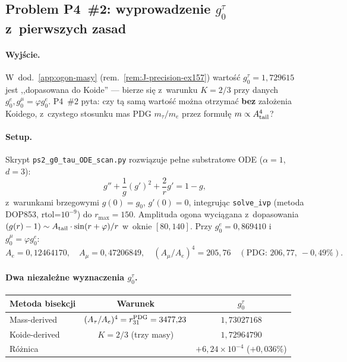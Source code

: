 \subsection{Problem P4~\#2: wyprowadzenie $g_0^\tau$
z~pierwszych zasad}%
\label{app:P4-g0tau}

\paragraph{Wyj\'scie.}
W~dod.~\ref{app:ogon-masy} (rem.~\ref{rem:J-precision-ex157})
warto\'s\'c $g_0^\tau = 1{,}729615$ jest ,,dopasowana do Koide'' ---
bierze si\k{e} z~warunku $K=2/3$ przy danych $g_0^e, g_0^\mu = \varphi g_0^e$.
P4~\#2 pyta: czy t\k{a} sam\k{a} warto\'s\'c mo\.zna otrzyma\'c \textbf{bez}
za\l{}o\.zenia Koidego, z~czystego stosunku mas PDG $m_\tau/m_e$
przez formu\l{}\k{e} $m \propto A_{\rm tail}^4$?

\paragraph{Setup.}
Skrypt \texttt{ps2\_g0\_tau\_ODE\_scan.py} rozwi\k{a}zuje pe\l{}ne substratowe
ODE ($\alpha=1$, $d=3$):
\begin{equation}
  g'' + \frac{1}{g}(g')^2 + \frac{2}{r}g' = 1 - g,
  \label{eq:P4-substrate-ODE}
\end{equation}
z~warunkami brzegowymi $g(0) = g_0$, $g'(0) = 0$, integruj\k{a}c
\texttt{solve\_ivp} (metoda DOP853, rtol=$10^{-9}$) do $r_{\max} = 150$.
Amplituda ogona wyci\k{a}gana z~dopasowania $(g(r)-1) \sim A_{\rm tail}\cdot\sin(r+\varphi)/r$
w~oknie $[80,140]$. Przy $g_0^e=0{,}869410$ i~$g_0^\mu = \varphi g_0^e$:
\[
  A_e = 0{,}12464170,\quad
  A_\mu = 0{,}47206849,\quad
  (A_\mu/A_e)^4 = 205{,}76 \quad (\text{PDG: }206{,}77,\ -0{,}49\%).
\]

\paragraph{Dwa niezale\.zne wyznaczenia $g_0^\tau$.}

\begin{center}\small
\begin{tabular}{@{}lcc@{}}
\toprule
Metoda bisekcji & Warunek & $g_0^\tau$ \\
\midrule
Mass-derived & $(A_\tau/A_e)^4 = r_{31}^{\rm PDG} = 3477{,}23$ & $1{,}73027168$ \\
Koide-derived & $K = 2/3$ (trzy masy) & $1{,}72964790$ \\
\midrule
R\'o\.znica & & $+6{,}24\!\times\!10^{-4}$ ($+0{,}036\%$) \\
\bottomrule
\end{tabular}
\end{center}

